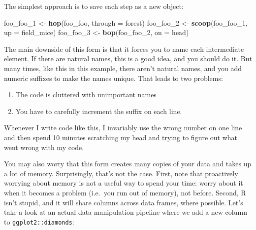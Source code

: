 \documentclass[]{book}
\newenvironment{Shaded}{\begin{snugshade}}{\end{snugshade}}
\newcommand{\KeywordTok}[1]{\textcolor[rgb]{0.13,0.29,0.53}{\textbf{{#1}}}}
\newcommand{\DataTypeTok}[1]{\textcolor[rgb]{0.13,0.29,0.53}{{#1}}}
\newcommand{\StringTok}[1]{\textcolor[rgb]{0.31,0.60,0.02}{{#1}}}
\newcommand{\CommentTok}[1]{\textcolor[rgb]{0.56,0.35,0.01}{\textit{{#1}}}}
\newcommand{\NormalTok}[1]{{#1}}
\begin{document}
The simplest approach is to save each step as a new object:

\begin{Shaded}
\begin{Highlighting}[]
\NormalTok{foo_foo_1 <-}\StringTok{ }\KeywordTok{hop}\NormalTok{(foo_foo, }\DataTypeTok{through =} \NormalTok{forest)}
\NormalTok{foo_foo_2 <-}\StringTok{ }\KeywordTok{scoop}\NormalTok{(foo_foo_1, }\DataTypeTok{up =} \NormalTok{field_mice)}
\NormalTok{foo_foo_3 <-}\StringTok{ }\KeywordTok{bop}\NormalTok{(foo_foo_2, }\DataTypeTok{on =} \NormalTok{head)}
\end{Highlighting}
\end{Shaded}

The main downside of this form is that it forces you to name each
intermediate element. If there are natural names, this is a good idea,
and you should do it. But many times, like this in this example, there
aren't natural names, and you add numeric suffixes to make the names
unique. That leads to two problems:

\begin{enumerate}
\def\labelenumi{\arabic{enumi}.}
\item
  The code is cluttered with unimportant names
\item
  You have to carefully increment the suffix on each line.
\end{enumerate}

Whenever I write code like this, I invariably use the wrong number on
one line and then spend 10 minutes scratching my head and trying to
figure out what went wrong with my code.

You may also worry that this form creates many copies of your data and
takes up a lot of memory. Surprisingly, that's not the case. First, note
that proactively worrying about memory is not a useful way to spend your
time: worry about it when it becomes a problem (i.e.~you run out of
memory), not before. Second, R isn't stupid, and it will share columns
across data frames, where possible. Let's take a look at an actual data
manipulation pipeline where we add a new column to
\texttt{ggplot2::diamonds}:

\begin{Shaded}
\end{Shaded}
\end{document}
